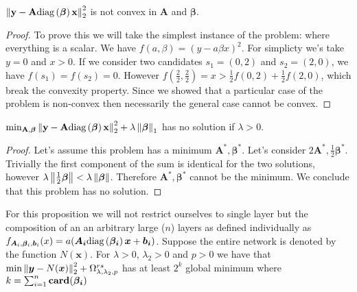 \begin{proposition} \label{unconstrained_non_convex}
$     \left\lVert\bf{y} - \bf{A}\text{diag}\left(\bm{\beta}\right)\bf{x}\right\rVert_2^2
$ is not convex in $\bm{A}$ and $\bm{\beta}$.
\begin{proof}
  To prove this we will take the simplest instance of the problem: where everything is a scalar. We have $f(a, \beta) = \left(y - a\beta x\right)^2$. For simplicty we's take $y = 0$ and $x > 0$. If we consider two candidates $s_1 = (0, 2)$ and $s_2 = (2, 0)$, we have $f(s_1) = f(s_2) = 0$. However $f(\frac{2}{2}, \frac{2}{2}) = x > \frac{1}{2} f(0, 2) + \frac{1}{2}f(2, 0)$, which break the convexity property. Since we showed that a particular case of the problem is non-convex then necessarily the general case cannot be convex.
\end{proof}
\end{proposition}

\begin{proposition}
\label{unconstrained_shrinknet_no_min}
$     \min_{\bf{A}, \bm{\beta}} \left\lVert\bf{y} - \bf{A}\text{diag}\left(\bm{\beta}\right)\bf{x}\right\rVert_2^2 + \lambda \left\lVert\bm{\beta}\right\rVert_1
$
has no solution if $\lambda > 0$.
\end{proposition}
\begin{proof}
  Let's assume this problem has a minimum $\bm{A}^*, \bm{\beta}^*$. Let's consider $2\bm{A}^*, \frac{1}{2}\bm{\beta}^*$. Trivially the first component of the sum is identical for the two solutions, however $\lambda\left\lVert\frac{1}{2}\bm{\beta}\right\rVert < \lambda\left\lVert\bm{\beta}\right\rVert$. Therefore $\bm{A}^*, \bm{\beta}^*$ cannot be the minimum. We conclude that this problem has no solution.
\end{proof}
\begin{proposition}
  \label{shrinknet_regularized_minimum}
For this proposition we will not restrict ourselves to single layer but the composition of an an arbitrary large ($n$) layers as defined individually as $f_{\bm{A}_i, \bm{\beta}_i, \bm{b}_i}(x) = a(\bm{A_i}\text{diag}\left(\bm{\beta_i}\right)\bm{x} + \bm{b_i})$. 
Suppose the entire network is denoted by the function $N(\bm{x})$.
For $\lambda > 0$, $\lambda_2 > 0$ and $p > 0$ we have that $\min \left\lVert\bm{y} - N(\bm{x})\right\rVert_2^2 + \Omega_{\lambda, \lambda_2, p}^{rs}$ has at least $2^k$ global minimum where $k = \sum_{i=1}^n {\bf card}(\bm{\beta_i})$
\end{proposition}


